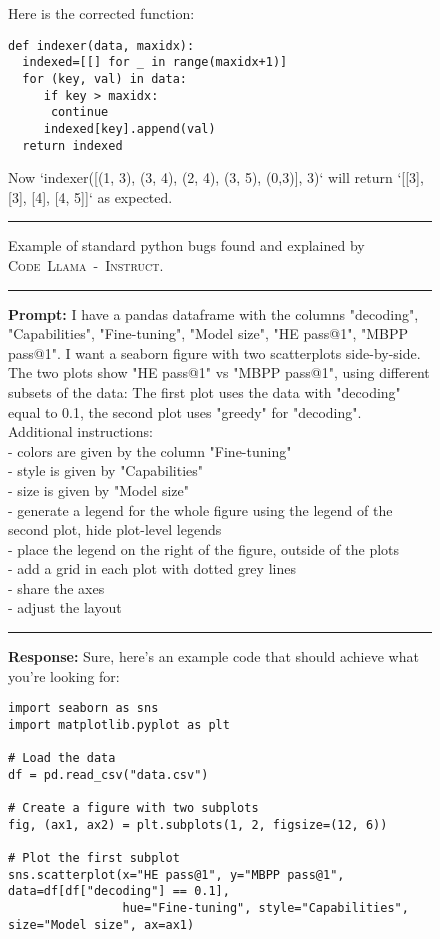 \documentclass[10pt]{article}
\newcommand{\instmodel}{\textsc{Code~Llama~-~Instruct}\xspace}
\begin{document}
\begin{figure}[h!]
Here is the corrected function:
\begin{verbatim}
def indexer(data, maxidx):
  indexed=[[] for _ in range(maxidx+1)]
  for (key, val) in data:
     if key > maxidx:
      continue
     indexed[key].append(val)
  return indexed
\end{verbatim}
Now `indexer([(1, 3), (3, 4), (2, 4), (3, 5), (0,3)], 3)` will return `[[3], [3], [4], [4, 5]]` as expected.

\noindent\rule{\textwidth}{1pt}
\caption{Example of standard python bugs found and explained by \instmodel.\label{fig:pythonbugsamelist}}
\end{figure}

\begin{figure}
\vspace{-1.2cm}
\footnotesize
\noindent\rule{\textwidth}{1pt}
\textbf{Prompt:} I have a pandas dataframe with the columns "decoding", "Capabilities", "Fine-tuning", "Model size", "HE pass@1", "MBPP pass@1". I want a seaborn figure with two scatterplots side-by-side. The two plots show "HE pass@1" vs "MBPP pass@1", using different subsets of the data: The first plot uses the data with "decoding" equal to 0.1, the second plot uses "greedy" for "decoding".\\
Additional instructions:\\
- colors are given by the column "Fine-tuning"\\
- style is given by "Capabilities"\\
- size is given by "Model size"\\
- generate a legend for the whole figure using the legend of the second plot, hide plot-level legends\\
- place the legend on the right of the figure, outside of the plots\\
- add a grid in each plot with dotted grey lines\\
- share the axes\\
- adjust the layout\\
\noindent\rule{\textwidth}{1pt}
\textbf{Response: }
 Sure, here's an example code that should achieve what you're looking for:
\begin{verbatim}
import seaborn as sns
import matplotlib.pyplot as plt

# Load the data
df = pd.read_csv("data.csv")

# Create a figure with two subplots
fig, (ax1, ax2) = plt.subplots(1, 2, figsize=(12, 6))

# Plot the first subplot
sns.scatterplot(x="HE pass@1", y="MBPP pass@1", data=df[df["decoding"] == 0.1],
                hue="Fine-tuning", style="Capabilities", size="Model size", ax=ax1)


\end{verbatim}
\end{figure}
\end{document}
